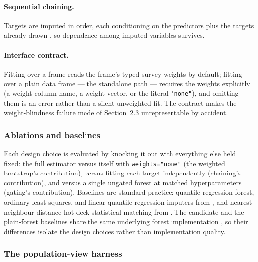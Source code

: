 \paragraph{Sequential chaining.} Targets are imputed in order, each
conditioning on the predictors plus the targets already drawn
\citep{raghunathan2003multiple, vanbuuren2011mice}, so dependence among
imputed variables survives.

\paragraph{Interface contract.} Fitting over a \populace{} frame reads the
frame's typed survey weights by default; fitting over a plain data frame ---
the standalone path --- requires the weights explicitly (a weight column name,
a weight vector, or the literal \texttt{"none"}), and omitting them is an
error rather than a silent unweighted fit. The contract makes the
weight-blindness failure mode of Section~2.3 unrepresentable by accident.

\subsubsection{Ablations and baselines}
\label{imp:sec:ablations}

Each design choice is evaluated by knocking it out with everything else held
fixed: the full estimator versus itself with \texttt{weights="none"} (the
weighted bootstrap's contribution), versus fitting each target independently
(chaining's contribution), and versus a single ungated forest at matched
hyperparameters (gating's contribution). Baselines are standard practice:
quantile-regression-forest, ordinary-least-squares, and linear
quantile-regression imputers from \microimpute{}
\citep{policyengine2025microimpute}, and nearest-neighbour-distance hot-deck
statistical matching from \pystatmatch{} \citep{dorazio2021statistical}. The
candidate and the plain-forest baselines share the same underlying forest
implementation \citep{zillow2024quantile}, so their differences isolate the
design choices rather than implementation quality.

\subsubsection{The population-view harness}
\label{imp:sec:harness}

